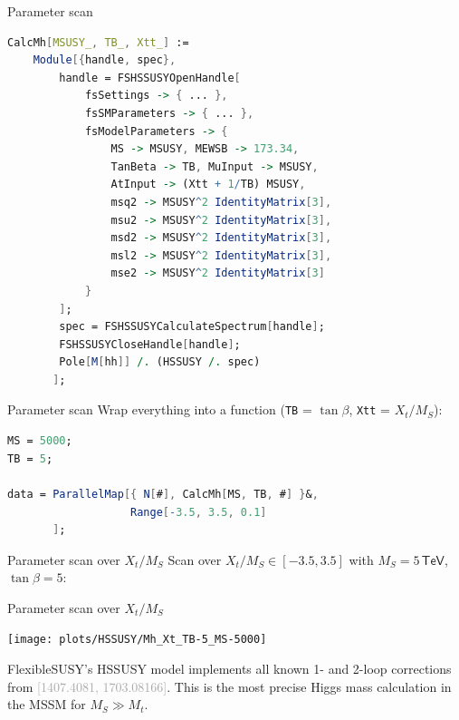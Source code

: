 \documentclass[hyperref={pdfpagelabels=false},ngerman]{beamer}
\newcommand{\eh}[1]{\,\mathsf{#1}}
\newcommand{\MS}{\ensuremath{M_S}}
\newcommand{\bigcite}[1]{\textcolor{darkgray}{[#1]}}
\begin{document}
\begin{frame}{Parameter scan}
  \usebox{\listbox}
\end{frame}

\begin{lrbox}{\listbox}\begin{lstlisting}[language=Mathematica]
CalcMh[MSUSY_, TB_, Xtt_] :=
    Module[{handle, spec},
        handle = FSHSSUSYOpenHandle[
            fsSettings -> { ... },
            fsSMParameters -> { ... },
            fsModelParameters -> {
                MS -> MSUSY, MEWSB -> 173.34,
                TanBeta -> TB, MuInput -> MSUSY,
                AtInput -> (Xtt + 1/TB) MSUSY,
                msq2 -> MSUSY^2 IdentityMatrix[3],
                msu2 -> MSUSY^2 IdentityMatrix[3],
                msd2 -> MSUSY^2 IdentityMatrix[3],
                msl2 -> MSUSY^2 IdentityMatrix[3],
                mse2 -> MSUSY^2 IdentityMatrix[3]
            }
        ];
        spec = FSHSSUSYCalculateSpectrum[handle];
        FSHSSUSYCloseHandle[handle];
        Pole[M[hh]] /. (HSSUSY /. spec)
       ];
\end{lstlisting}\end{lrbox} %

\begin{frame}{Parameter scan}
  Wrap everything into a function (\texttt{TB} = $\tan\beta$, \texttt{Xtt} = $X_t/\MS$):\\[1em]
  \usebox{\listbox}
\end{frame}

\begin{lrbox}{\listbox}\begin{lstlisting}[language=Mathematica]
MS = 5000;
TB = 5;

data = ParallelMap[{ N[#], CalcMh[MS, TB, #] }&,
                   Range[-3.5, 3.5, 0.1]
       ];
\end{lstlisting}\end{lrbox} %

\begin{frame}{Parameter scan over $X_t/\MS$}
  Scan over $X_t/\MS \in [-3.5, 3.5]$ with $\MS = 5\eh{TeV}$, $\tan\beta = 5$:\\[2em]
  \usebox{\listbox}
\end{frame}

\begin{frame}{Parameter scan over $X_t/\MS$}
  \begin{center}
    \texttt{[image: plots/HSSUSY/Mh\_Xt\_TB-5\_MS-5000]}
  \end{center}
  FlexibleSUSY's HSSUSY model implements all known 1- and 2-loop
  corrections from \bigcite{1407.4081, 1703.08166}.  This is the most
  precise Higgs mass calculation in the MSSM for $\MS \gg M_t$.
\end{frame}
\end{document}
